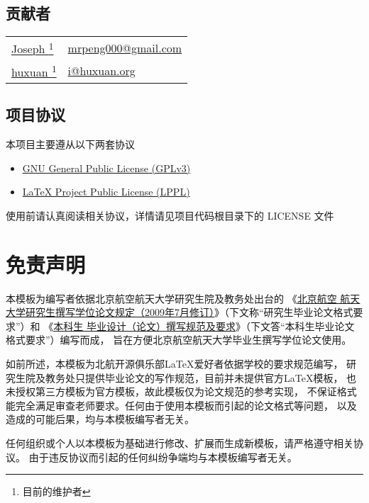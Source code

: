 \subsection{贡献者}
\begin{tabularx}{\textwidth}{@{\hspace{2em}}ll}
    \href{https://github.com/JosephPeng/}{Joseph \footnote{目前的维护者}} &
    \href{mailto:mrpeng000@gmail.com}{mrpeng000@gmail.com} \\
    \href{http://huxuan.org/}{huxuan \textsuperscript{1}} &
    \href{mailto:i@huxuan.org}{i@huxuan.org} \\
\end{tabularx}

\subsection{项目协议}
本项目主要遵从以下两套协议
\begin{itemize}
    \item \href{http://www.gnu.org/licenses/gpl.txt}
        {GNU General Public License (GPLv3)}
    \item \href{http://www.latex-project.org/lppl.txt}
        {\LaTeX{} Project Public License (LPPL)}
\end{itemize}
使用前请认真阅读相关协议，详情请见项目代码根目录下的 LICENSE 文件

\section{免责声明}
本模板为编写者依据北京航空航天大学研究生院及教务处出台的
《\href{http://graduate.buaa.edu.cn/ch/u/cms/www/201210/25173751avdq.doc}{北京航空
航天大学研究生撰写学位论文规定（2009年7月修订）}》（下文称“研究生毕业论文格式要求”）和
《\href{http://jiaowu.buaa.edu.cn:8080/edu/viewNewsList.do?newsid=32&queryType=5}{本科生
毕业设计（论文）撰写规范及要求}》（下文答“本科生毕业论文格式要求”）编写而成，
旨在方便北京航空航天大学毕业生撰写学位论文使用。

如前所述，本模板为北航开源俱乐部\LaTeX{}爱好者依据学校的要求规范编写，
研究生院及教务处只提供毕业论文的写作规范，目前并未提供官方\LaTeX{}模板，
也未授权第三方模板为官方模板，故此模板仅为论文规范的参考实现，
不保证格式能完全满足审查老师要求。任何由于使用本模板而引起的论文格式等问题，
以及造成的可能后果，均与本模板编写者无关。

任何组织或个人以本模板为基础进行修改、扩展而生成新模板，请严格遵守相关协议。
由于违反协议而引起的任何纠纷争端均与本模板编写者无关。

